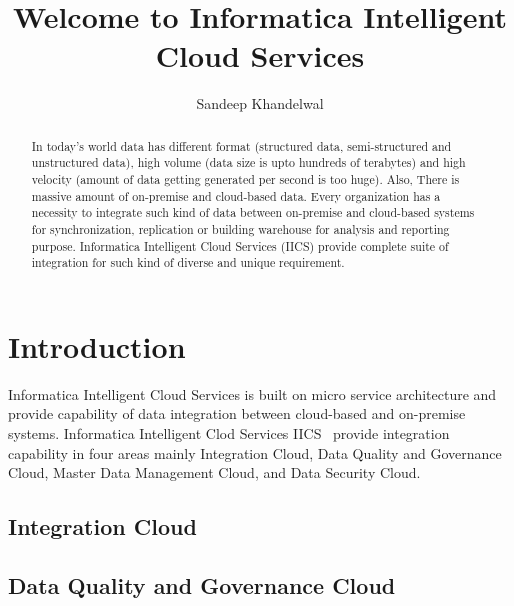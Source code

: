 \title{Welcome to Informatica Intelligent Cloud Services}

\author{Sandeep Khandelwal}

\renewcommand{\shortauthors}{S. Khandelwal}

\begin{abstract}
	
In today's world data has different format (structured data, semi-structured and
unstructured data), high volume (data size is upto hundreds of terabytes)
and high velocity (amount of data getting generated per second is too
huge). Also, There is massive amount of on-premise and cloud-based data. 
Every organization has a necessity to integrate such kind of
data between on-premise and cloud-based systems for synchronization, replication or building warehouse for analysis and reporting purpose. Informatica Intelligent Cloud Services (IICS) provide complete suite of integration for such kind of diverse and unique requirement.

\end{abstract}



\maketitle


\section{Introduction}

Informatica Intelligent Cloud Services is built on micro service
architecture and provide capability of data integration between
cloud-based and on-premise systems. Informatica Intelligent Clod Services IICS~\cite{hid-sp18-511-iics} provide integration capability in four areas mainly Integration Cloud,
Data Quality and Governance Cloud, Master Data Management Cloud, and
Data Security Cloud.

\subsection{Integration Cloud}

\subsection{Data Quality and Governance Cloud}

